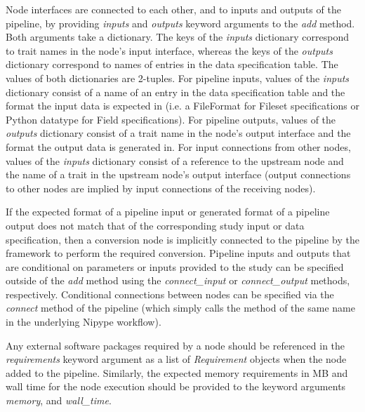 \documentclass[smallextended]{svjour3}       %
\begin{document}
Node interfaces are connected to each other, and to inputs and outputs of the pipeline, by
providing \emph{inputs} and \emph{outputs} keyword arguments to the \emph{add} method. Both
arguments take a dictionary. The keys of the \emph{inputs} dictionary correspond to
trait names in the node's input interface, whereas the keys of the \emph{outputs} dictionary correspond to
names of entries in the data specification table. The values of both dictionaries are 2-tuples. For pipeline
inputs, values of the \emph{inputs} dictionary consist of a name of an entry in the data specification table
and the format the input data is expected in (i.e. a FileFormat for Fileset specifications or Python datatype for Field specifications).
For pipeline outputs, values of the \emph{outputs} dictionary consist of a trait name in the node's output interface and the format the
output data is generated in. For input connections from other nodes, values of the \emph{inputs} dictionary
consist of a reference to the upstream node and the name of a trait in the
upstream node's output interface (output connections to other nodes are implied by input connections of the receiving nodes).

If the expected format of a pipeline input or generated format of a pipeline output does not match that
of the corresponding study input or data specification, then a conversion node is implicitly connected
to the pipeline by the framework to perform the required conversion. Pipeline inputs and outputs
that are conditional on parameters or inputs provided to the study can be specified outside of the
\emph{add} method using the \emph{connect\_input} or
\emph{connect\_output} methods, respectively. Conditional connections between
nodes can be specified via the \emph{connect} method of the pipeline (which simply calls the
method of the same name in the underlying Nipype workflow).

Any external software packages required by a node should be referenced
in the \emph{requirements} keyword argument as a list of
\emph{Requirement} objects when the node added to the pipeline.
Similarly, the expected memory requirements in MB and
wall time for the node execution should be provided to the keyword arguments
\emph{memory}, and \emph{wall\_time}.
\end{document}

